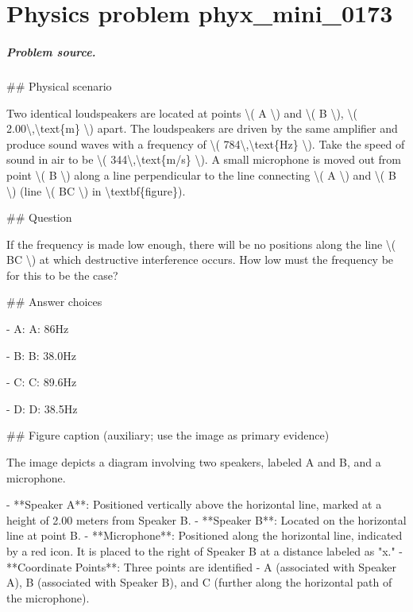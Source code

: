 
\chapter{Physics problem phyx\_mini\_0173}
\label{ch:PhyXMiniProblems_problem_phyx_mini_0173}

\paragraph{Problem source.}
\#\# Physical scenario

Two identical loudspeakers are located at points \textbackslash{}( A \textbackslash{}) and \textbackslash{}( B \textbackslash{}), \textbackslash{}( 2.00\textbackslash{},\textbackslash{}text\{m\} \textbackslash{}) apart. The loudspeakers are driven by the same amplifier and produce sound waves with a frequency of \textbackslash{}( 784\textbackslash{},\textbackslash{}text\{Hz\} \textbackslash{}). Take the speed of sound in air to be \textbackslash{}( 344\textbackslash{},\textbackslash{}text\{m/s\} \textbackslash{}). A small microphone is moved out from point \textbackslash{}( B \textbackslash{}) along a line perpendicular to the line connecting \textbackslash{}( A \textbackslash{}) and \textbackslash{}( B \textbackslash{}) (line \textbackslash{}( BC \textbackslash{}) in \textbackslash{}textbf\{figure\}).

\#\# Question

If the frequency is made low enough, there will be no positions along the line \textbackslash{}( BC \textbackslash{}) at which destructive interference occurs. How low must the frequency be for this to be the case?

\#\# Answer choices

- A: A: 86Hz

- B: B: 38.0Hz

- C: C: 89.6Hz

- D: D: 38.5Hz

\#\# Figure caption (auxiliary; use the image as primary evidence)

The image depicts a diagram involving two speakers, labeled A and B, and a microphone. 

- **Speaker A**: Positioned vertically above the horizontal line, marked at a height of 2.00 meters from Speaker B.
- **Speaker B**: Located on the horizontal line at point B.
- **Microphone**: Positioned along the horizontal line, indicated by a red icon. It is placed to the right of Speaker B at a distance labeled as "x."
- **Coordinate Points**: Three points are identified - A (associated with Speaker A), B (associated with Speaker B), and C (further along the horizontal path of the microphone).

